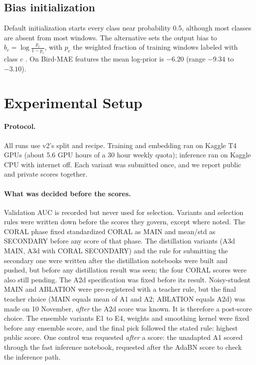 \documentclass[letterpaper]{article} %
\begin{document}
\subsection{Bias initialization}
Default initialization starts every class near probability 0.5, although most classes are absent from most windows. The alternative sets the output bias to $b_c=\log\frac{p_c}{1-p_c}$, with $p_c$ the weighted fraction of training windows labeled with class $c$ \citep{lin2017focal}. On Bird-MAE features the mean log-prior is $-6.20$ (range $-9.34$ to $-3.10$).

\section{Experimental Setup}
\paragraph{Protocol.}
All runs use v2's split and recipe. Training and embedding ran on Kaggle T4 GPUs (about 5.6 GPU hours of a 30 hour weekly quota); inference ran on Kaggle CPU with internet off. Each variant was submitted once, and we report public and private scores together.

\paragraph{What was decided before the scores.}
Validation AUC is recorded but never used for selection. Variants and selection rules were written down before the scores they govern, except where noted. The CORAL phase fixed standardized CORAL as MAIN and mean/std as SECONDARY before any score of that phase. The distillation variants (A3d MAIN, A3d with CORAL SECONDARY) and the rule for submitting the secondary one were written after the distillation notebooks were built and pushed, but before any distillation result was seen; the four CORAL scores were also still pending. The A2d specification was fixed before its result. Noisy-student MAIN and ABLATION were pre-registered with a teacher rule, but the final teacher choice (MAIN equals mean of A1 and A2; ABLATION equals A2d) was made on 10 November, \emph{after} the A2d score was known. It is therefore a post-score choice. The ensemble variants E1 to E4, weights and smoothing kernel were fixed before any ensemble score, and the final pick followed the stated rule: highest public score. One control was requested \emph{after} a score: the unadapted A1 scored through the fast inference notebook, requested after the AdaBN score to check the inference path.
\end{document}

